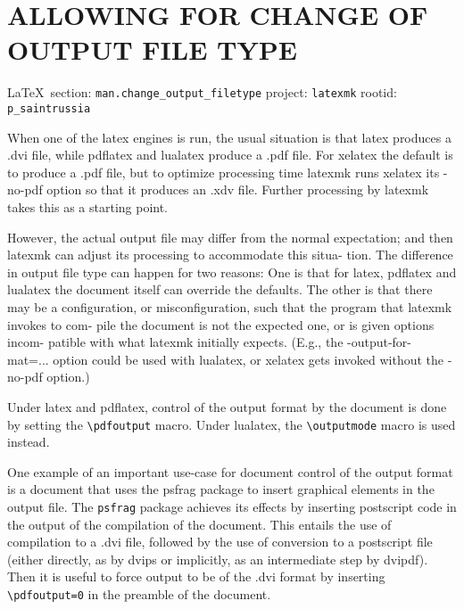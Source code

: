  
 
\section{ALLOWING FOR CHANGE OF OUTPUT FILE TYPE}
  
\vspace{0.5cm}
 {\ifDEBUG\small\LaTeX~section: \verb|man.change_output_filetype| project: \verb|latexmk| rootid: \verb|p_saintrussia| \fi}
\vspace{0.5cm}

When one of the latex engines is run, the usual situation is that latex
produces  a .dvi file, while pdflatex and lualatex produce a .pdf file.  For
xelatex the default is to produce a .pdf file, but to optimize processing time
latexmk  runs xelatex its -no-pdf option so that it produces an .xdv file.
Further processing by  latexmk  takes  this  as  a starting point.

However, the actual output file may differ from the normal expectation; and
then latexmk can adjust its processing to accommodate  this  situa- tion.   The
difference in output file type can happen for two reasons: One is that for
latex, pdflatex and lualatex the  document  itself  can override  the defaults.
The other is that there may be a configuration, or misconfiguration, such that
the program that latexmk invokes to com- pile  the  document is not the
expected one, or is given options incom- patible with what latexmk initially
expects.  (E.g.,  the  -output-for- mat=...   option  could  be used with
lualatex, or xelatex gets invoked without the -no-pdf option.)

Under latex and pdflatex, control of the output format by the  document is
done by setting the \verb|\pdfoutput| macro.  Under lualatex, the
\verb|\outputmode| macro is used instead.

One example of an important use-case for document control of the output format
is  a document that uses the psfrag package to insert graphical elements in the
output file. The \verb|psfrag| package achieves its effects by inserting
postscript code in the output of the compilation of the document.  This entails
the use of compilation to a .dvi file, followed  by the  use  of  conversion
to  a postscript file (either directly, as by dvips or implicitly, as an
intermediate step by dvipdf).   Then  it  is useful  to  force output to be of
the .dvi format by inserting \verb|\pdfoutput=0| in the preamble of the
document.

